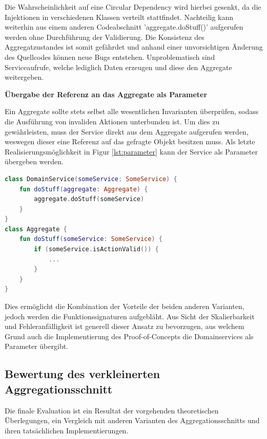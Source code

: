Die Wahrscheinlichkeit auf eine Circular Dependency wird hierbei gesenkt, da die Injektionen in verschiedenen Klassen verteilt stattfindet. Nachteilig kann weiterhin aus einem anderen Codeabschnitt 'aggregate.doStuff()' aufgerufen werden ohne Durchführung der Validierung. Die Konsistenz des Aggregatzustandes ist somit gefährdet und anhand einer unvorsichtigen Änderung des Quellcodes können neue Bugs entstehen. Unproblematisch sind Serviceaufrufe, welche lediglich Daten erzeugen und diese den Aggregate weitergeben.

\textbf{Übergabe der Referenz an das Aggregate als Parameter}

Ein Aggregate sollte stets selbst alle wesentlichen Invarianten überprüfen, sodass die Ausführung von invaliden Aktionen unterbunden ist. Um dies zu gewährleisten, muss der Service direkt aus dem Aggregate aufgerufen werden, weswegen dieser eine Referenz auf das gefragte Objekt besitzen muss. Als letzte Realisierungsmöglichkeit in Figur \ref{lst:parameter} kann der Service als Parameter übergeben werden.

\begin{minipage}{\linewidth} %
	\begin{lstlisting}[caption={Übergabe der Referenz an das Aggregate als Parameter}, label={lst:parameter}, language=Kotlin]
class DomainService(someService: SomeService) {
	fun doStuff(aggregate: Aggregate) {
		aggregate.doStuff(someService)
	}
}
class Aggregate {
	fun doStuff(someService: SomeService) {
		if (someService.isActionValid()) {
			...
		}
	}
}
	\end{lstlisting}
\end{minipage}

Dies ermöglicht die Kombination der Vorteile der beiden anderen Varianten, jedoch werden die Funktionssignaturen aufgebläht. Aus Sicht der Skalierbarkeit und Fehleranfälligkeit ist generell dieser Ansatz zu bevorzugen, aus welchem Grund auch die Implementierung des Proof-of-Concepts die Domainservices als Parameter übergibt.

\subsection{Bewertung des verkleinerten Aggregationsschnitt}

Die finale Evaluation ist ein Resultat der vorgehenden theoretischen Überlegungen, ein Vergleich mit anderen Varianten des Aggregationsschnitts und ihren tatsächlichen Implementierungen.

